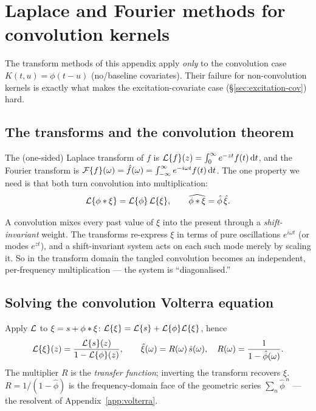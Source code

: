 \section{Laplace and Fourier methods for convolution kernels}
\label{app:transforms}

The transform methods of this appendix apply \emph{only} to the convolution case
$K(t,u)=\phi(t-u)$ (no/baseline covariates). Their failure for non-convolution
kernels is exactly what makes the excitation-covariate case
(\S\ref{sec:excitation-cov}) hard.

\subsection{The transforms and the convolution theorem}

The (one-sided) Laplace transform of $f$ is
$\mathcal{L}\{f\}(z)=\int_0^\infty e^{-zt}f(t)\,\mathrm{d} t$, and the Fourier transform is
$\mathcal{F}\{f\}(\omega)=\hat f(\omega)=\int_{-\infty}^\infty e^{-i\omega t}f(t)\,\mathrm{d} t$.
The one property we need is that both turn convolution into multiplication:
\begin{equation}
\mathcal{L}\{\phi\ast\xi\}=\mathcal{L}\{\phi\}\,\mathcal{L}\{\xi\},\qquad
\widehat{\phi\ast\xi}=\hat\phi\,\hat\xi .
\end{equation}

\begin{intuition}
A convolution mixes every past value of $\xi$ into the present through a
\emph{shift-invariant} weight. The transforms re-express $\xi$ in terms of pure
oscillations $e^{i\omega t}$ (or modes $e^{zt}$), and a shift-invariant system acts
on each such mode merely by scaling it. So in the transform domain the tangled
convolution becomes an independent, per-frequency multiplication --- the system is
``diagonalised.''
\end{intuition}

\subsection{Solving the convolution Volterra equation}

Apply $\mathcal{L}$ to $\xi=s+\phi\ast\xi$:
$\mathcal{L}\{\xi\}=\mathcal{L}\{s\}+\mathcal{L}\{\phi\}\mathcal{L}\{\xi\}$, hence
\begin{equation}
\mathcal{L}\{\xi\}(z)=\frac{\mathcal{L}\{s\}(z)}{1-\mathcal{L}\{\phi\}(z)},
\qquad
\hat\xi(\omega)=R(\omega)\,\hat s(\omega),\quad R(\omega)=\frac{1}{1-\hat\phi(\omega)} .
\label{eq:transfer}
\end{equation}
The multiplier $R$ is the \emph{transfer function}; inverting the transform
recovers $\xi$. $R=1/(1-\hat\phi)$ is the frequency-domain face of the geometric
series $\sum_n\hat\phi^{\,n}$ --- the resolvent of Appendix~\ref{app:volterra}.

